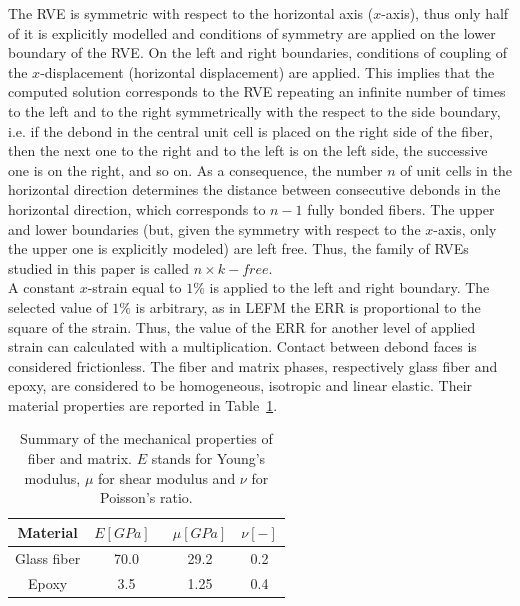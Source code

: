 The RVE is symmetric with respect to the horizontal axis ($x$-axis), thus only half of it is explicitly modelled and conditions of symmetry are applied on the lower boundary of the RVE. On the left and right boundaries, conditions of coupling of the $x$-displacement (horizontal displacement) are applied. This implies that the computed solution corresponds to the RVE repeating an infinite number of times to the left and to the right symmetrically with the respect to the side boundary, i.e. if the debond in the central unit cell is placed on the right side of the fiber, then the next one to the right and to the left is on the left side, the successive one is on the right, and so on. As a consequence, the number $n$ of unit cells in the horizontal direction determines the distance between consecutive debonds in the horizontal direction, which corresponds to $n-1$ fully bonded fibers. The upper and lower boundaries (but, given the symmetry with respect to the $x$-axis, only the upper one is explicitly modeled) are left free. Thus, the family of RVEs studied in this paper is called $n\times k-free$.\\
A constant $x$-strain equal to $1\%$ is applied to the left and right boundary. The selected value of $1\%$ is arbitrary, as in LEFM the ERR is proportional to the square of the strain. Thus, the value of the ERR for another level of applied strain can calculated with a multiplication. Contact between debond faces is considered frictionless. The fiber and matrix phases, respectively glass fiber and epoxy, are considered to be homogeneous, isotropic and linear elastic. Their material properties are reported in Table~\ref{chap3:paperB:tab:phaseprop}.

\begin{table}[!htbp]
 \centering
 \caption{Summary of the mechanical properties of fiber and matrix. $E$ stands for Young's modulus, $\mu$ for shear modulus and $\nu$ for Poisson's ratio.}
 \begin{tabular}{cccc}
\\
\textbf{Material} & \textbf{$E\left[GPa\right]$}\ & \textbf{$\mu\left[GPa\right]$} & \textbf{$\nu\left[-\right]$} \\
\midrule
Glass fiber    & 70.0  & 29.2   & 0.2  \\
Epoxy    & 3.5    & 1.25   & 0.4
\end{tabular}
\label{chap3:paperB:tab:phaseprop}
\end{table}

